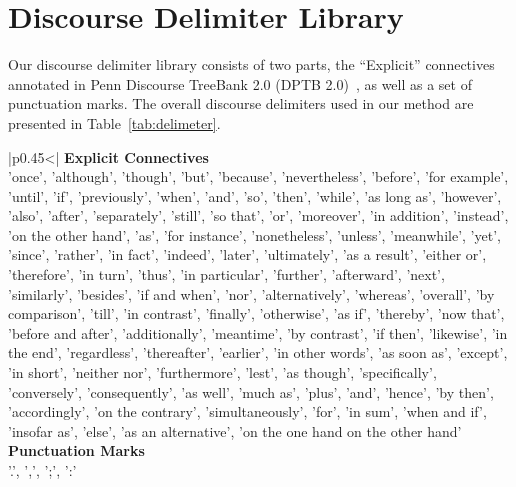 \documentclass[11pt]{article}
\begin{document}




\newpage
\appendix
\section{Discourse Delimiter Library}
\label{sec:library}
Our discourse delimiter library consists of two parts, the ``Explicit'' connectives annotated in Penn Discourse TreeBank 2.0 (DPTB 2.0)~\cite{prasad2008penn}, as well as a set of punctuation marks. The overall discourse delimiters used in our method are presented in Table~\ref{tab:delimeter}.

\begin{table}[bh!]
    \footnotesize
\setlength{\belowcaptionskip}{-0.15cm}
	\begin{tabular}{
|p{}<\centering|
    }
    \hline
    \textbf{Explicit Connectives} \\
    \hline
    'once', 'although', 'though', 'but', 'because', 'nevertheless', 'before', 'for example', 'until', 'if', 'previously', 'when', 'and', 'so', 'then', 'while', 'as long as', 'however', 'also', 'after', 'separately', 'still', 'so that', 'or', 'moreover', 'in addition', 'instead', 'on the other hand', 'as', 'for instance', 'nonetheless', 'unless', 'meanwhile', 'yet', 'since', 'rather', 'in fact', 'indeed', 'later', 'ultimately', 'as a result', 'either or', 'therefore', 'in turn', 'thus', 'in particular', 'further', 'afterward', 'next', 'similarly', 'besides', 'if and when', 'nor', 'alternatively', 'whereas', 'overall', 'by comparison', 'till', 'in contrast', 'finally', 'otherwise', 'as if', 'thereby', 'now that', 'before and after', 'additionally', 'meantime', 'by contrast', 'if then', 'likewise', 'in the end', 'regardless', 'thereafter', 'earlier', 'in other words', 'as soon as', 'except', 'in short', 'neither nor', 'furthermore', 'lest', 'as though', 'specifically', 'conversely', 'consequently', 'as well', 'much as', 'plus', 'and', 'hence', 'by then', 'accordingly', 'on the contrary', 'simultaneously', 'for', 'in sum', 'when and if', 'insofar as', 'else', 'as an alternative', 'on the one hand on the other hand' \\
    \hline\hline
    \textbf{Punctuation Marks} \\
    \hline
    '.', ',', ';', ':' \\
    \hline
    \end{tabular}
    \caption{The discourse delimiter library in our implementation.}
    \label{tab:delimeter}
\end{table}
\end{document}
